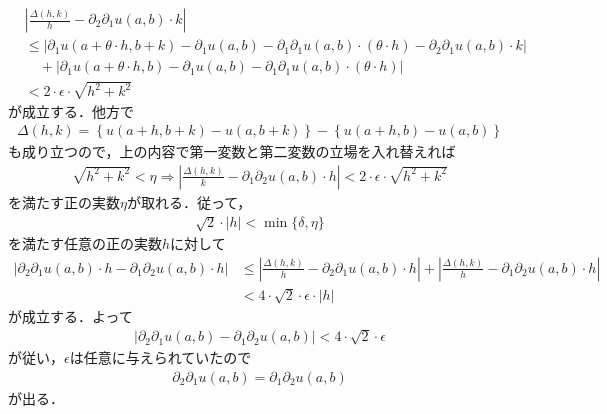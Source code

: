 \begin{sketch}
		\begin{align}
			&\left|\frac{\Delta(h,k)}{h} - \partial_2 \partial_1 u(a,b) \cdot k\right| \\
			&\leq \left|\partial_1 u(a+\theta \cdot h,b+k) - \partial_1 u(a,b) 
			- \partial_1 \partial_1 u(a,b) \cdot (\theta \cdot h) - \partial_2 \partial_1 u(a,b) \cdot k\right| \\
			&\quad + \left|\partial_1 u(a+\theta \cdot h,b) - \partial_1 u(a,b) 
			- \partial_1 \partial_1 u(a,b) \cdot (\theta \cdot h)\right| \\
			&< 2 \cdot \epsilon \cdot \sqrt{h^2 + k^2}
		\end{align}
		が成立する．他方で
		\begin{align}
			\Delta(h,k) = \left\{u(a+h,b+k) - u(a,b+k)\right\} - \left\{u(a+h,b) - u(a,b)\right\}
		\end{align}
		も成り立つので，上の内容で第一変数と第二変数の立場を入れ替えれば
		\begin{align}
			\sqrt{h^2 + k^2} < \eta \Longrightarrow 
			\left|\frac{\Delta(h,k)}{k} - \partial_1 \partial_2 u(a,b) \cdot h\right| 
			< 2 \cdot \epsilon \cdot \sqrt{h^2 + k^2}
		\end{align}
		を満たす正の実数$\eta$が取れる．従って，
		\begin{align}
			\sqrt{2} \cdot |h| < \min\{\delta,\eta\}
		\end{align}
		を満たす任意の正の実数$h$に対して
		\begin{align}
			\left|\partial_2 \partial_1 u(a,b) \cdot h - \partial_1 \partial_2 u(a,b) \cdot h\right|
			&\leq \left|\frac{\Delta(h,k)}{h} - \partial_2 \partial_1 u(a,b) \cdot h\right| 
			+ \left|\frac{\Delta(h,k)}{h} - \partial_1 \partial_2 u(a,b) \cdot h\right| \\
			&< 4 \cdot \sqrt{2} \cdot \epsilon \cdot |h|
		\end{align}
		が成立する．よって
		\begin{align}
			\left|\partial_2 \partial_1 u(a,b) - \partial_1 \partial_2 u(a,b)\right| < 4 \cdot \sqrt{2} \cdot \epsilon
		\end{align}
		が従い，$\epsilon$は任意に与えられていたので
		\begin{align}
			\partial_2 \partial_1 u(a,b) = \partial_1 \partial_2 u(a,b)
		\end{align}
		が出る．
		\QED
	\end{sketch}